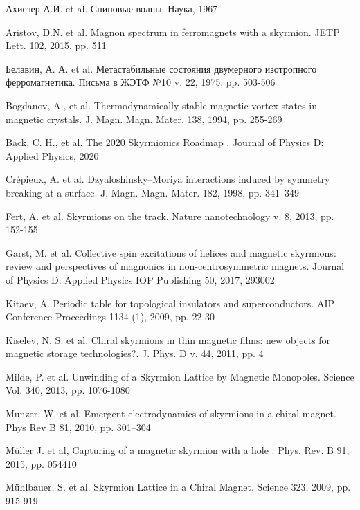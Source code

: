 \documentclass[a4paper,article,14pt]{extarticle}
\begin{document}
\begin{thebibliography}{1}
 Ахиезер А.И. et al. \flqq Спиновые волны\frqq. Наука, 1967

 Aristov, D.N. et al. \flqq Magnon spectrum in ferromagnets with a skyrmion\frqq. JETP Lett. 102, 2015, pp. 511

 Белавин, А. А. et al. \flqq Метастабильные состояния двумерного изотропного ферромагнетика\frqq. Письма в ЖЭТФ №10 v. 22, 1975, pp. 503-506

 Bogdanov, A., et al. \flqq Thermodynamically stable magnetic vortex states in magnetic crystals\frqq. J. Magn. Magn. Mater. 138, 1994, pp. 255-269
 
 Back, C. H., et al.  \flqq The 2020 Skyrmionics Roadmap \frqq. Journal of Physics D: Applied Physics, 2020

 Crépieux, A. et al. \flqq Dzyaloshinsky–Moriya interactions induced by symmetry breaking at a surface\frqq.  J. Magn. Magn. Mater. 182, 1998, pp. 341–349

 Fert, A. et al. \flqq Skyrmions on the track\frqq. Nature nanotechnology v. 8, 2013, pp. 152-155

 Garst, M. et al. \flqq Collective spin excitations of helices and magnetic skyrmions: review and perspectives of magnonics in non-centrosymmetric magnets\frqq. Journal of Physics D: Applied Physics IOP Publishing 50, 2017, 293002

 Kitaev, A. \flqq Periodic table for topological insulators and superconductors\frqq. AIP Conference Proceedings 1134 (1), 2009, pp. 22-30

 Kiselev, N. S. et al. \flqq Chiral skyrmions in thin magnetic films: new objects for magnetic storage technologies?\frqq. J. Phys. D v. 44, 2011, pp. 4

 Milde, P. et al. \flqq Unwinding of a Skyrmion Lattice by Magnetic Monopoles\frqq. Science Vol. 340, 2013, pp. 1076-1080

 Munzer, W. et al. \flqq Emergent electrodynamics of skyrmions in a chiral magnet\frqq. Phys Rev B 81, 2010, pp. 301–304

 Müller J. et al, \flqq Capturing of a magnetic skyrmion with a hole \flqq. Phys. Rev. B 91, 2015, pp. 054410

 Mühlbauer, S. et al. \flqq Skyrmion Lattice in a Chiral Magnet\frqq. Science 323, 2009, pp. 915-919


\end{thebibliography}
\end{document}
